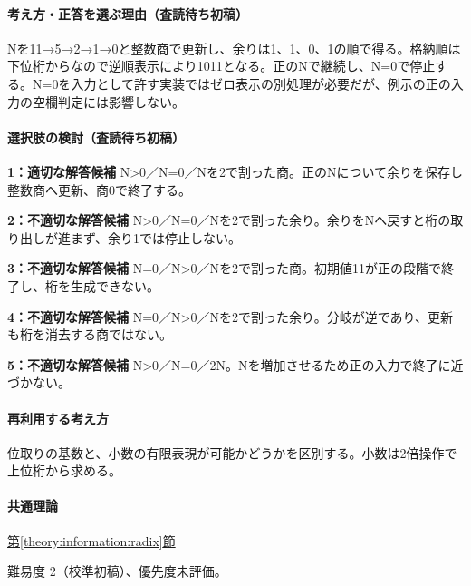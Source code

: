 \paragraph{考え方・正答を選ぶ理由（査読待ち初稿）} Nを11→5→2→1→0と整数商で更新し、余りは1、1、0、1の順で得る。格納順は下位桁からなので逆順表示により1011となる。正のNで継続し、N=\allowbreak{}0で停止する。N=\allowbreak{}0を入力として許す実装ではゼロ表示の別処理が必要だが、例示の正の入力の空欄判定には影響しない。

\paragraph{選択肢の検討（査読待ち初稿）}\mbox{}\par

\noindent\textbf{1：適切な解答候補} N>0／N=\allowbreak{}0／Nを2で割った商。正のNについて余りを保存し整数商へ更新、商0で終了する。\par

\noindent\textbf{2：不適切な解答候補} N>0／N=\allowbreak{}0／Nを2で割った余り。余りをNへ戻すと桁の取り出しが進まず、余り1では停止しない。\par

\noindent\textbf{3：不適切な解答候補} N=\allowbreak{}0／N>0／Nを2で割った商。初期値11が正の段階で終了し、桁を生成できない。\par

\noindent\textbf{4：不適切な解答候補} N=\allowbreak{}0／N>0／Nを2で割った余り。分岐が逆であり、更新も桁を消去する商ではない。\par

\noindent\textbf{5：不適切な解答候補} N>0／N=\allowbreak{}0／2N。Nを増加させるため正の入力で終了に近づかない。\par

\paragraph{再利用する考え方} 位取りの基数と、小数の有限表現が可能かどうかを区別する。小数は2倍操作で上位桁から求める。

\paragraph{共通理論} \hyperref[theory:information:radix]{第\ref*{theory:information:radix}節}

\par 難易度 2（校準初稿）、優先度未評価。


